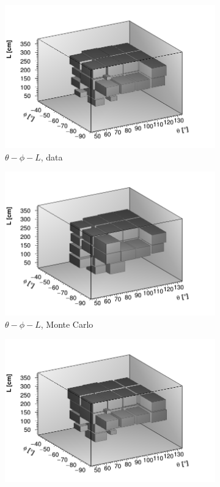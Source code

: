 \documentclass[a4paper]{scrartcl}
\begin{document}
\begin{figure}[htbp]
\begin{center}
\begin{subfigure}{0.52\textwidth}
\includegraphics[width=\linewidth]{theta_phi_l_data.png}
\caption{$\theta - \phi - L$, data} \label{fig:3d_cry}
\end{subfigure}\begin{subfigure}{0.52\textwidth}
\includegraphics[width=\linewidth]{theta_phi_l_mc.png}
\caption{$\theta - \phi - L$, Monte Carlo}\label{fig:3d_cry_mc}
\end{subfigure}
\begin{subfigure}{0.52\textwidth}
\includegraphics[width=\linewidth]{ratio_theta_phi_l.png}

\end{subfigure}
\end{center}
\end{figure}
\end{document}
